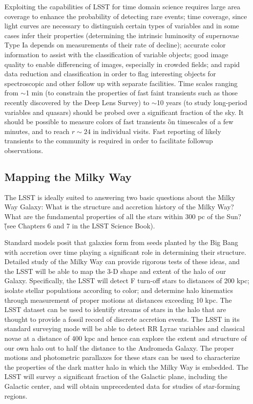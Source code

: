 Exploiting the capabilities of LSST for time domain science requires large
area coverage to enhance the probability of detecting rare events; time
coverage, since light curves are necessary to distinguish certain types of
variables and in some cases infer their properties (\eg determining the
intrinsic luminosity of supernovae Type Ia depends on measurements of their
rate of decline); accurate color information to assist with the
classification of variable objects; good image quality to enable
differencing of images, especially in crowded fields; and rapid data
reduction and classification in order to flag interesting objects for
spectroscopic and other follow up with separate facilities. Time scales
ranging from $\sim$1 min (to constrain the properties of fast faint
transients such as those recently discovered by the Deep Lens Survey) to
$\sim$10 years (to study long-period variables and quasars) should be
probed over a significant fraction of the sky. It should be possible to
measure colors of fast transients \G{on timescales of a few minutes},
and to reach $r \sim 24$ in individual visits. Fast reporting of likely transients
to the community is required in order to facilitate followup observations.



\subsection{Mapping the Milky Way \label{sec:MW}}


The LSST is ideally suited to answering two basic questions about the Milky
Way Galaxy: What is the structure and accretion history of the Milky Way?
What are the fundamental properties of all the stars within 300 pc of the
Sun? \G{(see Chapters 6 and 7 in the LSST Science Book).}

Standard models posit that galaxies form from seeds planted by the Big Bang
with accretion over time playing a significant role in determining their
structure.  Detailed study of the Milky Way can provide rigorous tests of
these ideas, and the LSST will be able to map the 3-D shape and extent of
the halo of our Galaxy.  Specifically, the LSST will detect F turn-off
stars to distances of 200 kpc; isolate stellar populations according to
color; and determine halo kinematics through measurement of proper motions
at distances exceeding 10 kpc. The LSST dataset can be used to identify
streams of stars in the halo that are thought to provide a fossil record of
discrete accretion events. The LSST in its standard surveying mode will be
able to detect RR Lyrae variables and classical novae at a distance of 400
kpc and hence can explore the extent and structure of our own halo out to
half the distance to the Andromeda Galaxy. The proper motions and
photometric parallaxes for these stars can be used to characterize the
properties of the dark matter halo in which the Milky Way is embedded.
The LSST will survey a significant fraction of the Galactic plane,
including the Galactic center, and will obtain unprecedented data for
studies of star-forming regions.

